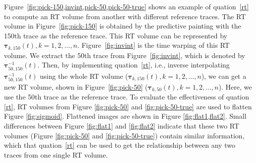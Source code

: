     Figure~\ref{fig:pick-150,invint,pick-50,pick-50-true} shows an example of
     quation~\ref{rt} to compute an RT volume from 
    another  with different reference traces. 
    The RT volume in Figure~\ref{fig:pick-150} is obtained by the predictive 
    painting with the 150th trace as the reference trace. 
    This RT volume can be represented by $\mathbf{\tau}_{k,150}(t), 
    k=1,2,\ldots,n$. 
    Figure~\ref{fig:invint} is the time warping of this RT volume. 
    We extract the 50th trace from Figure~\ref{fig:invint}, which is denoted by 
    $\mathbf{\tau}^{-1}_{50,150}(t)$. 
    Then, by implementing quation~\ref{rt}, i.e., inverse 
    interpolating $\mathbf{\tau}^{-1}_{50,150}(t)$ using the whole RT volume 
    ($\mathbf{\tau}_{k,150}(t), k=1,2,\ldots,n$), we can get a new 
    RT volume, shown in Figure~\ref{fig:pick-50} ($\mathbf{\tau}_{k,50}(t), 
    k=1,2,\ldots,n$). Here, we use the 50th trace as the reference trace. 
    To evaluate the effectiveness of quation \ref{rt}, RT 
    volumes from Figure \ref{fig:pick-50} and \ref{fig:pick-50-true} are used to 
    flatten Figure \ref{fig:sigmoid}. 
    Flattened images are shown in Figure \ref{fig:flat1,flat2}. Small 
    differences between Figure \ref{fig:flat1} and \ref{fig:flat2} indicate that 
    these two RT volumes (Figure \ref{fig:pick-50} and \ref{fig:pick-50-true}) 
    contain similar information, which  that 
    quation~\ref{rt} can be used to get the relationship between 
    any two traces from one single RT volume.
    

